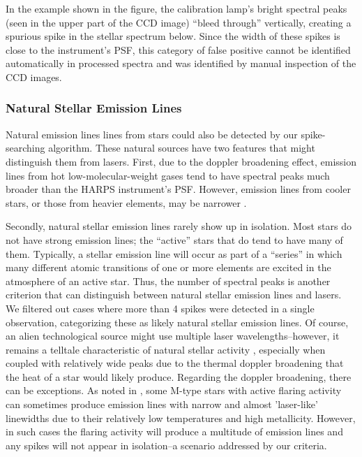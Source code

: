 \documentclass[linenumbers]{aastex631}
\begin{document}
In the example shown in the figure, the calibration lamp's bright spectral peaks (seen in the upper part of the CCD image) ``bleed through'' vertically, creating a spurious spike in the stellar spectrum below.  Since the width of these spikes is close to the instrument's PSF, this category of false positive cannot be identified automatically in processed spectra and was identified by manual inspection of the CCD images.

\subsubsection{Natural Stellar Emission Lines}
\label{s:stellaremission}
Natural emission lines lines from stars could also be detected by our spike-searching algorithm.  These natural sources have two features that might distinguish them from lasers.  First, due to the doppler broadening effect, emission lines from hot low-molecular-weight gases tend to have spectral peaks much broader than the HARPS instrument's PSF. However, emission lines from cooler stars, or those from heavier elements, may be narrower \citep{Livadiotis_2018}.
 
Secondly, natural stellar emission lines rarely show up in isolation. Most stars do not have strong emission lines; the ``active'' stars that do tend to have many of them. Typically, a stellar emission line will occur as part of a “series” in which many different atomic transitions of one or more elements are excited in the atmosphere of an active star.  Thus, the number of spectral peaks is another criterion that can distinguish between natural stellar emission lines and lasers. We filtered out cases where more than 4 spikes were detected in a single observation, categorizing these as likely natural stellar emission lines.  Of course, an alien technological source might use multiple laser wavelengths--however, it remains a telltale characteristic of natural stellar activity \citep{Livadiotis_2018}, especially when coupled with relatively wide peaks due to the thermal doppler broadening that the heat of a star would likely produce. Regarding the doppler broadening, there can be exceptions. As noted in \citep{ProximaCentauri}, some M-type stars with active flaring activity can sometimes produce emission lines  with  narrow and almost 'laser-like' linewidths due to their relatively low temperatures and high metallicity. However, in such cases the flaring activity will produce a multitude of emission lines and any spikes will not appear in isolation--a scenario addressed by our  criteria.
\end{document}
